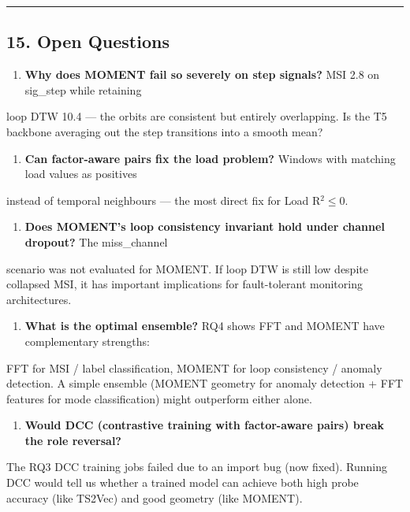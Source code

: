 \documentclass[11pt,a4paper]{article}
\begin{document}
\vspace{4pt}\hrule\vspace{4pt}

\subsection{15. Open Questions}

\begin{enumerate}
  \item \textbf{Why does MOMENT fail so severely on step signals?} MSI 2.8 on sig\_step while retaining
\end{enumerate}
   loop DTW 10.4 --- the orbits are consistent but entirely overlapping. Is the T5 backbone
   averaging out the step transitions into a smooth mean?

\begin{enumerate}
  \item \textbf{Can factor-aware pairs fix the load problem?} Windows with matching load values as positives
\end{enumerate}
   instead of temporal neighbours --- the most direct fix for Load R$^2$$\leq$0.

\begin{enumerate}
  \item \textbf{Does MOMENT's loop consistency invariant hold under channel dropout?} The miss\_channel
\end{enumerate}
   scenario was not evaluated for MOMENT. If loop DTW is still low despite collapsed MSI,
   it has important implications for fault-tolerant monitoring architectures.

\begin{enumerate}
  \item \textbf{What is the optimal ensemble?} RQ4 shows FFT and MOMENT have complementary strengths:
\end{enumerate}
   FFT for MSI / label classification, MOMENT for loop consistency / anomaly detection.
   A simple ensemble (MOMENT geometry for anomaly detection + FFT features for mode
   classification) might outperform either alone.

\begin{enumerate}
  \item \textbf{Would DCC (contrastive training with factor-aware pairs) break the role reversal?}
\end{enumerate}
   The RQ3 DCC training jobs failed due to an import bug (now fixed). Running DCC would tell
   us whether a trained model can achieve both high probe accuracy (like TS2Vec) and
   good geometry (like MOMENT).
\end{document}
